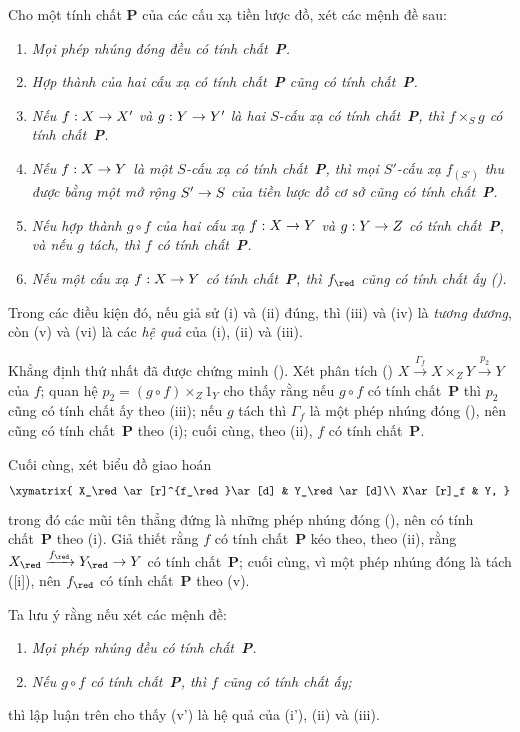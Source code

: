 \documentclass[oneside]{amsart}
\makeatletter
\newcommand{\ega@arrow}[2]{\mathchoice{#1}{#2}{#2}{#2}}
\renewcommand{\to}{\ega@arrow{\longrightarrow}{\rightarrow}}
\newcommand{\oldpage}[2][]{{\marginnote{\normalfont\textbf{#1}~|~#2}}\ignorespaces}
\let\EGAOriginalLabel\label
\renewcommand{\label}[1]{\phantomsection\EGAOriginalLabel{#1}}
\makeatother
\begin{document}
\begin{remark}[5.5.12]
\label{I.5.5.12}
Cho một tính chất \textbf{P} của các cấu xạ tiền lược đồ, xét các mệnh đề
sau:
\begin{enumerate}
  \item[\rm(i)] \emph{Mọi phép nhúng đóng đều có tính chất~\textbf{P}.}
  \item[\rm(ii)] \emph{Hợp thành của hai cấu xạ có tính chất~\textbf{P}
    cũng có tính chất~\textbf{P}.}
  \item[\rm(iii)] \emph{Nếu $f:X\to X'$ và $g:Y\to Y'$ là hai
    $S$-cấu xạ có tính chất~\textbf{P}, thì $f\times_S g$ có tính
    chất~\textbf{P}.}

\oldpage[I]{140}
  \item[\rm(iv)] \emph{Nếu $f:X\to Y$ là một $S$-cấu xạ có tính
    chất~\textbf{P}, thì mọi $S'$-cấu xạ $f_{(S')}$ thu được bằng một mở
    rộng $S'\to S$ của tiền lược đồ cơ sở cũng có tính chất~\textbf{P}.}
  \item[\rm(v)] \emph{Nếu hợp thành $g\circ f$ của hai cấu xạ
    $f:X\to Y$ và $g:Y\to Z$ có tính chất~\textbf{P}, và nếu $g$ tách,
    thì $f$ có tính chất~\textbf{P}.}
  \item[\rm(vi)] \emph{Nếu một cấu xạ $f:X\to Y$ có tính
    chất~\textbf{P}, thì $f_\red$ cũng có tính chất ấy
    ().}
\end{enumerate}

Trong các điều kiện đó, nếu giả sử (i) và (ii) đúng, thì (iii) và (iv) là
\emph{tương đương}, còn (v) và (vi) là các \emph{hệ quả} của (i), (ii) và
(iii).

Khẳng định thứ nhất đã được chứng minh ().
Xét phân tích ()
$X\xrightarrow{\Gamma_f}X\times_Z Y\xrightarrow{p_2}Y$ của $f$; quan hệ
$p_2=(g\circ f)\times_Z 1_Y$ cho thấy rằng nếu $g\circ f$ có tính
chất~\textbf{P} thì $p_2$ cũng có tính chất ấy theo (iii); nếu $g$ tách thì
$\Gamma_f$ là một phép nhúng đóng (), nên cũng có tính
chất~\textbf{P} theo (i); cuối cùng, theo (ii), $f$ có tính
chất~\textbf{P}.

Cuối cùng, xét biểu đồ giao hoán
\[
  \xymatrix{
    X_\red\ar[r]^{f_\red}\ar[d] &
    Y_\red\ar[d]\\
    X\ar[r]_f &
    Y,
  }
\]
trong đó các mũi tên thẳng đứng là những phép nhúng đóng
(), nên có tính chất~\textbf{P} theo (i). Giả thiết rằng $f$
có tính chất~\textbf{P} kéo theo, theo (ii), rằng
$X_\red\xrightarrow{f_\red}Y_\red\to Y$ có tính chất~\textbf{P}; cuối
cùng, vì một phép nhúng đóng là tách ([i]), nên $f_\red$ có
tính chất~\textbf{P} theo (v).

Ta lưu ý rằng nếu xét các mệnh đề:
\begin{enumerate}
  \item[\rm(i')] \emph{Mọi phép nhúng đều có tính chất~\textbf{P}.}
  \item[\rm(v')] \emph{Nếu $g\circ f$ có tính chất~\textbf{P}, thì $f$
    cũng có tính chất ấy;}
\end{enumerate}
thì lập luận trên cho thấy (v') là hệ quả của (i'), (ii) và (iii).
\end{remark}
\end{document}
